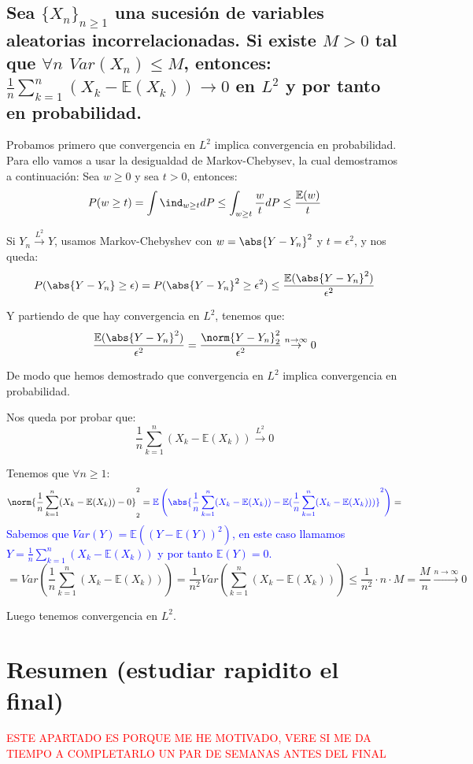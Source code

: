 \documentclass{apuntes}
\begin{document}
\section{Sea $\{X_n\}_{n\geq 1}$ una sucesión de variables aleatorias incorrelacionadas. Si existe $M>0$ tal que $\forall n$ $Var(X_n)\leq M$, entonces: $\frac{1}{n}\sum_{k=1}^{n}(X_k -\mathbb{E}(X_k)) \rightarrow 0$ en $L^2$ y por tanto en probabilidad.}

Probamos primero que convergencia en $L^2$ implica convergencia en probabilidad. Para ello vamos a usar la desigualdad de Markov-Chebysev, la cual demostramos a continuación: Sea $w \geq 0$ y sea $t>0$, entonces:
\[
P(w \geq t)=\int \ind_{w\geq t} dP \leq \int_{w  \geq t} \frac{w}{t} dP \leq \frac{\mathbb{E}(w)}{t}
\]

Si $Y_n \stackrel{L^2}{\rightarrow} Y$, usamos Markov-Chebyshev con $w=\abs{Y-Y_n}^2$ y $t=\epsilon^2$, y nos queda:
\[
P(\abs{Y-Y_n}\geq \epsilon)=P(\abs{Y-Y_n}^2 \geq \epsilon^2) \leq \frac{\mathbb{E}(\abs{Y-Y_n}^2)}{\epsilon^2}
\]

Y partiendo de que hay convergencia en $L^2$, tenemos que:
\[
\frac{\mathbb{E}(\abs{Y-Y_n}^2)}{\epsilon^2} = \frac{\norm{Y-Y_n}_2^2}{\epsilon^2} \stackrel{n \rightarrow \infty}{\rightarrow} 0
\]

De modo que hemos demostrado que convergencia en $L^2$ implica convergencia en probabilidad.

Nos queda por probar que:
\[
\frac{1}{n}\sum_{k=1}^{n}(X_k -\mathbb{E}(X_k)) \stackrel{L^2}{\rightarrow} 0
\]

Tenemos que $\forall n \geq 1$:
\[
\norm{\frac{1}{n}\sum_{k=1}^{n}(X_k -\mathbb{E}(X_k)) -0}_2^2 = \textcolor{blue}{\mathbb{E}\left(\abs{\frac{1}{n}\sum_{k=1}^{n}(X_k -\mathbb{E}(X_k))-\mathbb{E}(\frac{1}{n}\sum_{k=1}^{n}(X_k -\mathbb{E}(X_k)))}^2\right)}=
\]
\textcolor{blue}{Sabemos que $Var(Y)= \mathbb{E}((Y-\mathbb{E}(Y))^2)$, en este caso llamamos $Y = \frac{1}{n}\sum_{k=1}^{n}(X_k -\mathbb{E}(X_k))$ y por tanto $\mathbb{E}(Y)=0$.}
\[
= Var\left(\frac{1}{n}\sum_{k=1}^{n}(X_k -\mathbb{E}(X_k))\right) = \frac{1}{n^2}Var\left(\sum_{k=1}^{n}(X_k -\mathbb{E}(X_k))\right) \leq \frac{1}{n^2}\cdot n\cdot M = \frac{M}{n} \stackrel{n \rightarrow \infty}{\rightarrow} 0
\]

Luego tenemos convergencia en $L^2$.




\chapter{Resumen (estudiar rapidito el final)}
\textcolor{red}{ESTE APARTADO ES PORQUE ME HE MOTIVADO, VERE SI ME DA TIEMPO A COMPLETARLO UN PAR DE SEMANAS ANTES DEL FINAL}
\end{document}
